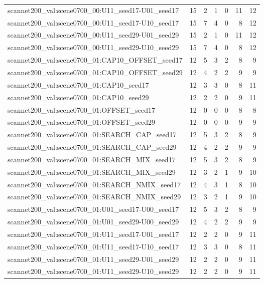 \begin{table}[t]
\begin{tabular}{lrrrrrr}
scannet200\_val:scene0700\_00:U11\_seed17-U01\_seed17 & 15 & 2 & 1 & 0 & 11 & 12 \\
scannet200\_val:scene0700\_00:U11\_seed17-U10\_seed17 & 15 & 7 & 4 & 0 & 8 & 12 \\
scannet200\_val:scene0700\_00:U11\_seed29-U01\_seed29 & 15 & 2 & 1 & 0 & 11 & 12 \\
scannet200\_val:scene0700\_00:U11\_seed29-U10\_seed29 & 15 & 7 & 4 & 0 & 8 & 12 \\
scannet200\_val:scene0700\_01:CAP10\_OFFSET\_seed17 & 12 & 5 & 3 & 2 & 8 & 9 \\
scannet200\_val:scene0700\_01:CAP10\_OFFSET\_seed29 & 12 & 4 & 2 & 2 & 9 & 9 \\
scannet200\_val:scene0700\_01:CAP10\_seed17 & 12 & 3 & 3 & 0 & 8 & 11 \\
scannet200\_val:scene0700\_01:CAP10\_seed29 & 12 & 2 & 2 & 0 & 9 & 11 \\
scannet200\_val:scene0700\_01:OFFSET\_seed17 & 12 & 0 & 0 & 0 & 8 & 8 \\
scannet200\_val:scene0700\_01:OFFSET\_seed29 & 12 & 0 & 0 & 0 & 9 & 9 \\
scannet200\_val:scene0700\_01:SEARCH\_CAP\_seed17 & 12 & 5 & 3 & 2 & 8 & 9 \\
scannet200\_val:scene0700\_01:SEARCH\_CAP\_seed29 & 12 & 4 & 2 & 2 & 9 & 9 \\
scannet200\_val:scene0700\_01:SEARCH\_MIX\_seed17 & 12 & 5 & 3 & 2 & 8 & 9 \\
scannet200\_val:scene0700\_01:SEARCH\_MIX\_seed29 & 12 & 3 & 2 & 1 & 9 & 10 \\
scannet200\_val:scene0700\_01:SEARCH\_NMIX\_seed17 & 12 & 4 & 3 & 1 & 8 & 10 \\
scannet200\_val:scene0700\_01:SEARCH\_NMIX\_seed29 & 12 & 3 & 2 & 1 & 9 & 10 \\
scannet200\_val:scene0700\_01:U01\_seed17-U00\_seed17 & 12 & 5 & 3 & 2 & 8 & 9 \\
scannet200\_val:scene0700\_01:U01\_seed29-U00\_seed29 & 12 & 4 & 2 & 2 & 9 & 9 \\
scannet200\_val:scene0700\_01:U11\_seed17-U01\_seed17 & 12 & 2 & 2 & 0 & 9 & 11 \\
scannet200\_val:scene0700\_01:U11\_seed17-U10\_seed17 & 12 & 3 & 3 & 0 & 8 & 11 \\
scannet200\_val:scene0700\_01:U11\_seed29-U01\_seed29 & 12 & 2 & 2 & 0 & 9 & 11 \\
scannet200\_val:scene0700\_01:U11\_seed29-U10\_seed29 & 12 & 2 & 2 & 0 & 9 & 11 \\

\end{tabular}
\end{table}
